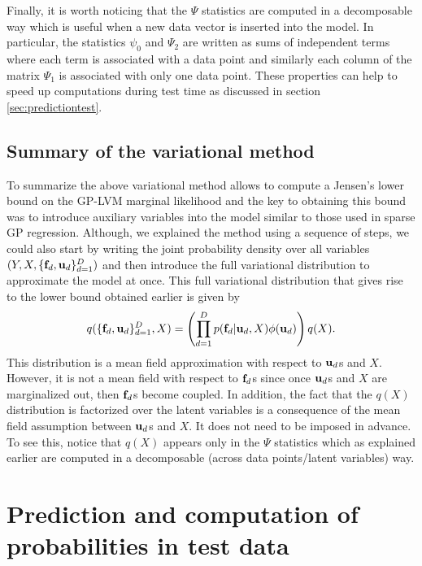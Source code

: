 \documentclass[twoside,times]{article}
\begin{document}
Finally, it is worth noticing that the $\Psi$ statistics are computed in 
a decomposable way which is useful when a new data vector %
is inserted into the model. In particular, the statistics 
$\psi_0$ and $\Psi_2$ are written as sums of independent terms
where each term is associated with a data point and similarly 
each column of the matrix $\Psi_1$ is associated with only one data point.
These properties can help to speed up computations during
test time as discussed in section \ref{sec:predictiontest}.  
 

\subsection{Summary of the variational method} 

To summarize the above variational method allows to compute a Jensen's
lower bound on the GP-LVM marginal likelihood and the key to obtaining
this bound was to introduce auxiliary variables into the model similar
to those used in sparse GP regression.  Although, we explained the
method using a sequence of steps, we could also start by writing the
joint probability density over all variables $(Y,X,\{\mathbf{f}_d,\mathbf{u}_d\}_{d=1}^D)$
and then introduce the full variational distribution to approximate
the model at once. This full variational distribution that gives rise
to the lower bound obtained earlier is given by
\begin{equation*}
q(\{\mathbf{f}_d,\mathbf{u}_d\}_{d=1}^D,X) = \left( \prod_{d=1}^D 
p(\mathbf{f}_d|\mathbf{u}_d,X) \phi(\mathbf{u}_d)\right) q(X). 
\end{equation*}
This distribution is a mean field approximation with respect
to $\mathbf{u}_d$s and $X$. However, it is not a mean field with respect to
$\mathbf{f}_d$s since once $\mathbf{u}_d$s and $X$ are marginalized out, then
$\mathbf{f}_d$s become coupled. In addition, the fact that the $q(X)$
distribution is factorized over the latent variables is a consequence
of the mean field assumption between $\mathbf{u}_d$s and $X$. It does not
need to be imposed in advance.  To see this, notice that $q(X)$
appears only in the $\Psi$ statistics which as explained earlier are
computed in a decomposable (across data points/latent variables) way.
 


\section{Prediction and computation of probabilities in  test data 
\label{sec:predictiontest} }
\end{document}
